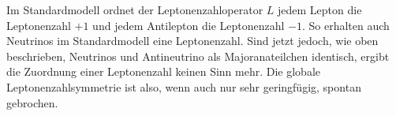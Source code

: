 Im Standardmodell ordnet der Leptonenzahloperator $L$ jedem Lepton die Leptonenzahl $+1$ und jedem Antilepton die Leptonenzahl $-1$.
So erhalten auch Neutrinos im Standardmodell eine Leptonenzahl. 
Sind jetzt jedoch, wie oben beschrieben, Neutrinos und Antineutrino als Majoranateilchen identisch, ergibt die Zuordnung einer Leptonenzahl keinen Sinn mehr.
Die globale Leptonenzahlsymmetrie ist also, wenn auch nur sehr geringfügig, spontan gebrochen.











